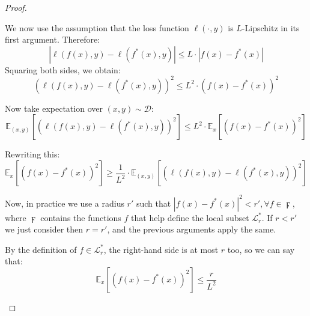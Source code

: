 \documentclass{article}
\newtheorem{proof}{Proof}
\begin{document}
\begin{proof}
\begin{enumerate}
    We now use the assumption that the loss function \( \ell(\cdot, y) \) is \( L \)-Lipschitz in its first argument. Therefore:
    \[
    \left| \ell(f(x), y) - \ell(f^*(x), y) \right| \leq L \cdot \left| f(x) - f^*(x) \right|
    \]
    Squaring both sides, we obtain:
    \[
    \left( \ell(f(x), y) - \ell(f^*(x), y) \right)^2 \leq L^2 \cdot \left( f(x) - f^*(x) \right)^2
    \]
    
    Now take expectation over \( (x, y) \sim \mathcal{D} \):
    \[
    \mathbb{E}_{(x, y)} \left[ \left( \ell(f(x), y) - \ell(f^*(x), y) \right)^2 \right] \leq L^2 \cdot \mathbb{E}_x \left[ \left( f(x) - f^*(x) \right)^2 \right]
    \]
    
    Rewriting this:
    \[
    \mathbb{E}_x \left[ \left( f(x) - f^*(x) \right)^2 \right] \geq \frac{1}{L^2} \cdot \mathbb{E}_{(x, y)} \left[ \left( \ell(f(x), y) - \ell(f^*(x), y) \right)^2 \right]
    \]

    Now, in practice we use a radius $r'$ such that $|f(x)-f^*(x)|^2 < r', \forall f \in \digamma$, where $\digamma$ contains the functions $f$ that help define the local subset $\mathcal{L}_r^*$. If $r < r'$ we just consider then $r = r'$, and the previous arguments apply the same.
    
    By the definition of \( f \in \mathcal{L}_r^* \), the right-hand side is at most \( r \) too, so we can say that:
    \[
    \mathbb{E}_x \left[ \left( f(x) - f^*(x) \right)^2 \right] \leq \frac{r}{L^2}
    \]


\end{enumerate}
\end{proof}
\end{document}
